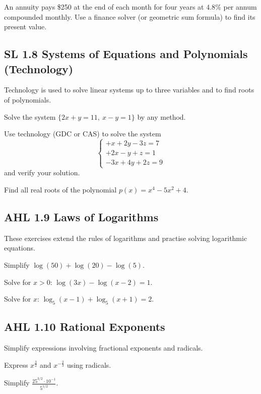 \documentclass[11pt]{article}
\newcommand{\tocsubsection}[1]{\subsection{#1}}
\newcounter{question}
\begin{document}
\begin{question}
An annuity pays \$250 at the end of each month for four years at
$4.8\%$ per annum compounded monthly.  Use a finance solver (or geometric sum
formula) to find its present value.
\end{question}

\tocsubsection{SL  1.8  \; Systems  of  Equations  and  Polynomials (Technology)}
Technology is used to solve linear systems up to three variables and to find
roots of polynomials.

\begin{question}
Solve the system $\{2x+y=11,\ x-y=1\}$ by any method.
\end{question}

\begin{question}
Use technology (GDC or CAS) to solve the system
\[\begin{cases}
+x+2y-3z=7\\
+2x-y+z=1\\
-3x+4y+2z=9
\end{cases}\]
and verify your solution.
\end{question}

\begin{question}
Find all real roots of the polynomial $p(x)=x^4-5x^2+4$.
\end{question}

\tocsubsection{AHL  1.9  \; Laws  of  Logarithms}
These exercises extend the rules of logarithms and practise solving logarithmic
equations.

\begin{question}
Simplify $\log(50)+\log(20)-\log(5)$.
\end{question}

\begin{question}
Solve for $x>0$: $\log(3x)-\log(x-2)=1$.
\end{question}

\begin{question}
Solve for $x$: $\log_5(x-1)+\log_5(x+1)=2$.
\end{question}

\tocsubsection{AHL  1.10  \; Rational  Exponents}
Simplify expressions involving fractional exponents and radicals.

\begin{question}
Express $x^{\frac{3}{2}}$ and $x^{-\frac{2}{3}}$ using radicals.
\end{question}

\begin{question}
Simplify $\displaystyle\frac{25^{3/2}\cdot 10^{-1}}{5^{1/2}}$.
\end{question}
\end{document}
